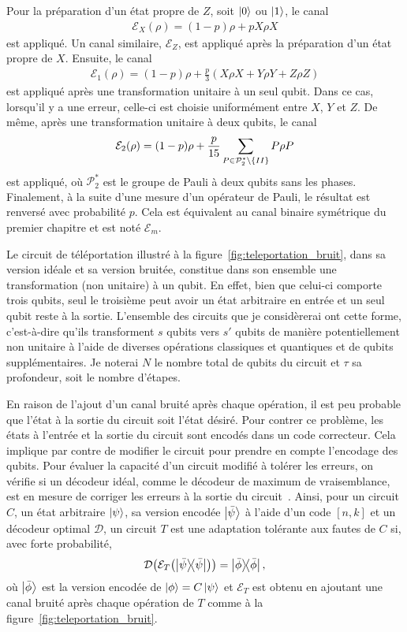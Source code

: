 Pour la préparation d'un état propre de $Z$, soit $\ket 0$ ou $\ket 1$,
le canal 
\begin{align}
\mathcal E_X(\rho) = (1 - p)\rho + pX\rho X
\end{align}
est appliqué.
Un canal similaire, $\mathcal E_Z$, est appliqué après la préparation
d'un état propre de $X$.
Ensuite,
le canal
\begin{align}
	\mathcal E_1(\rho) = (1 - p)\rho + \frac{p}{3}(X\rho X + Y\rho Y + Z\rho Z)
\end{align}
est appliqué après une transformation unitaire à un seul qubit.
Dans ce cas,
lorsqu'il y a une erreur,
celle-ci est choisie uniformément entre $X$, $Y$ et $Z$.
De même,
après une transformation unitaire à deux qubits,
le canal
\begin{align}
	\mathcal E_2(\rho)
	= (1 - p)\rho
	+ \frac{p}{15}\sum_{P \in \mathcal P_2^*\setminus \qty{II}} P\rho P
\end{align}
est appliqué,
où $\mathcal P_2^*$ est le groupe de Pauli à deux qubits sans les phases.
Finalement,
à la suite d'une mesure d'un opérateur de Pauli,
le résultat est renversé avec probabilité $p$.
Cela est équivalent au canal binaire symétrique du premier chapitre
et est noté $\mathcal E_m$.

Le circuit de téléportation illustré à la figure~\ref{fig:teleportation_bruit},
dans sa version idéale et sa version bruitée,
constitue dans son ensemble une transformation (non unitaire) à un qubit.
En effet,
bien que celui-ci comporte trois qubits,
seul le troisième peut avoir un état arbitraire en entrée et un seul qubit reste à la sortie.
L'ensemble des circuits que je considèrerai ont cette forme,
c'est-à-dire qu'ils transforment $s$ qubits vers $s'$ qubits de manière 
potentiellement non unitaire à l'aide de diverses opérations classiques et quantiques
et de qubits supplémentaires.
Je noterai $N$ le nombre total de qubits du circuit et $\tau$
sa profondeur, soit le nombre d'étapes. 

En raison de l'ajout d'un canal bruité après chaque opération,
il est peu probable que l'état à la sortie du circuit soit l'état désiré.
Pour contrer ce problème,
les états à l'entrée et la sortie du circuit sont encodés dans un code correcteur.
Cela implique par contre de modifier le circuit pour prendre en compte l'encodage des qubits.
Pour évaluer la capacité d'un circuit modifié à tolérer les erreurs,
on vérifie si un décodeur idéal, comme le décodeur de maximum de vraisemblance, est en 
mesure de corriger les erreurs à la sortie du circuit~\cite{gottesman_introduction_2009}.
Ainsi,
pour un circuit $C$,
un état arbitraire $\ket{\psi}$,
sa version encodée $\ket{\bar{\psi}}$ à l'aide d'un code $[n, k]$
et un décodeur optimal $\mathcal D$,
un circuit $T$ est une adaptation tolérante aux fautes de $C$ si,
avec forte probabilité,
\begin{align}
	\mathcal D\qty(\mathcal E_T\qty(\op{\bar \psi}) )
	= \op{\bar \phi},
	\label{eq:tol_faute_condition}
\end{align}
où $\ket{\bar \phi}$ est la version encodée de $\ket{\phi} = C \ket\psi$
et $\mathcal E_T$ est obtenu en ajoutant une canal bruité après chaque opération
de $T$ comme à la figure~\ref{fig:teleportation_bruit}.

